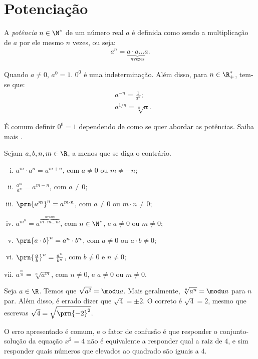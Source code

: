 \section{Potenciação}

\begin{definition}
A \emph{potência} $n \in \N^*$ de um número real $a$ é definida
como sendo a multiplicação de $a$ por ele mesmo $n$ vezes, ou seja:
%
\begin{align*}
a^n = \underbrace{a \cdot a  \dots  a}_{n \text{
vezes}}.
\end{align*}
\end{definition}

\begin{definition}
Quando $a \neq 0$, $a^0 = 1$. $0^0$ é uma indeterminação. Além disso, para $n \in \R^*_+$, tem-se que: 
\begin{align*}
&a^{-n} = \frac{1}{a^n}; \\
&a^{1/n} = \sqrt[n] a.
\end{align*}
\end{definition}

É comum definir $0^0 =1$ dependendo de como se quer abordar as potências. Saiba mais .

\begin{proposition}[Propriedades]
Sejam $a, b, n, m \in \R$, a menos que se diga o contrário.
\begin{enumerate}[i.]
	\item $a^m \cdot a^n = a^{m+n}$, com $a \ne 0$ ou $m \ne -n$;
	\item $\frac {a^m}{a^n} = a^{m-n}$, com $a \ne 0$;
	\item $\prn{a^m}^n = a^{m\cdot n}$, com $a \ne 0$ ou $m\cdot n \ne 0$;
	\item $a^{m^n} = a^{\overbrace{m \cdot m  \dots  m}^{n \text{
	vezes}}}$, com $n \in \N^*$, e $a \ne 0$ ou $m \ne 0$;
	\item $\prn{a \cdot b }^n= a^n \cdot b^n$, com $a \ne 0$ ou $a \cdot b \ne 0$;
	\item $\prn{\frac a b }^n = \frac {a^n} {b^n}$, com $b \ne 0$ e $n \ne 0$; 
	\item $a^{\frac m n} = \sqrt[n]{a^m}$, com $n \neq 0$, e $a \ne 0$ ou $m \ne 0$.
\end{enumerate}
\end{proposition}

\begin{remark}
Seja $a \in \R$. Temos que $\sqrt{a^2} = \modu a$. Mais geralmente, $\sqrt[n] {a^n} = \modu a$ para $n$ par. Além disso, é errado dizer que $\sqrt 4 = \pm 2$. O correto é $\sqrt 4 = 2$, mesmo que escrevas $\sqrt 4 = \sqrt{\prn {-2}^2}$. 

O erro apresentado é comum, e o fator de confusão é que responder o conjunto-solução da equação $x^2=4$ não é equivalente a responder qual a raiz de $4$, e sim responder quais números que elevados ao quadrado são iguais a $4$.
\end{remark}

